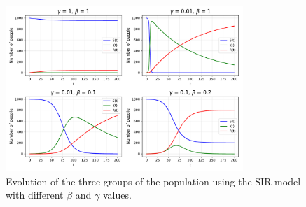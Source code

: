 \documentclass[10pt, preprint]{aastex}
\begin{document}
\begin{figure}[h]
    \centering
    \includegraphics[width=0.8\textwidth]{SIR.pdf}
    \caption{Evolution of the three groups of the population using the SIR model with different $\beta$ and $\gamma$ values.}
    \label{SIR}
\end{figure}
\end{document}
